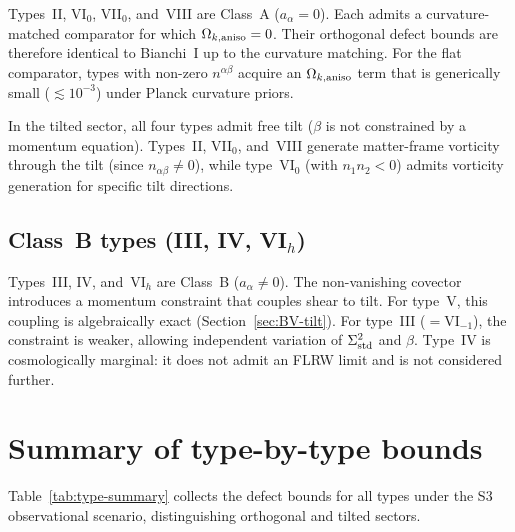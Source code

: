 Types~II, VI$_0$, VII$_0$, and~VIII are Class~A
($a_\alpha = 0$).  Each admits a curvature-matched comparator
for which $\Omega_{k,\mathrm{aniso}} = 0$.  Their orthogonal defect bounds are
therefore identical to Bianchi~I up to the curvature matching.
For the flat comparator, types with non-zero $n^{\alpha\beta}$
acquire an $\Omega_{k,\mathrm{aniso}}$ term that is generically small
($\lesssim 10^{-3}$) under Planck curvature priors.

In the tilted sector, all four types admit free tilt ($\beta$ is
not constrained by a momentum equation).  Types~II, VII$_0$,
and~VIII generate matter-frame vorticity through the tilt
(since $n_{\alpha\beta} \neq 0$), while type~VI$_0$ (with
$n_1 n_2 < 0$) admits vorticity generation for specific tilt
directions.


\subsection{Class~B types (III, IV, VI$_h$)}

Types~III, IV, and~VI$_h$ are Class~B ($a_\alpha \neq 0$).
The non-vanishing covector introduces a momentum constraint
that couples shear to tilt.  For type~V, this coupling is
algebraically exact (Section~\ref{sec:BV-tilt}).  For type~III
($= \mathrm{VI}_{-1}$), the constraint is weaker, allowing
independent variation of $\Sigma^2_{\mathrm{std}}$ and $\beta$.  Type~IV is
cosmologically marginal: it does not admit an FLRW limit and
is not considered further.


\section{Summary of type-by-type bounds}\label{sec:summary}

Table~\ref{tab:type-summary} collects the defect bounds for
all types under the S3 observational scenario, distinguishing
orthogonal and tilted sectors.

